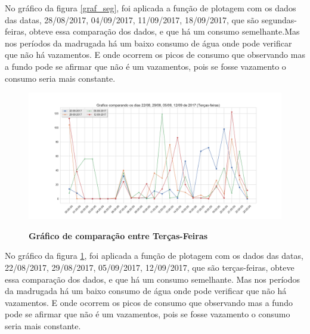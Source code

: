 \par No gráfico da figura \ref{graf_seg}, foi aplicada a função de plotagem com os dados das datas, 28/08/2017, 04/09/2017, 11/09/2017, 18/09/2017, que são segundas-feiras, obteve essa comparação dos dados, e que há um consumo semelhante.Mas nos períodos da madrugada há um baixo consumo de água onde pode verificar  que não há vazamentos. E onde ocorrem os picos de consumo que observando mas a fundo pode se afirmar que não é um vazamentos, pois se fosse vazamento o consumo seria mais constante.    

\begin{figure}[ht]
	\caption{\textbf{Gráfico de comparação entre Terças-Feiras}}
	\centering
		\includegraphics[width=\textwidth,height=\textheight , keepaspectratio]{figuras/Graficocomparandoosdias22-08,29-08,05-09,12-09de2017(Tercas-feiras)}
		\label{graf_ter}
\end{figure}

\par No gráfico da figura \ref{graf_ter}, foi aplicada a função de plotagem com os dados das datas, 22/08/2017, 29/08/2017, 05/09/2017, 12/09/2017, que são terças-feiras, obteve essa comparação dos dados, e que há um consumo semelhante. Mas nos períodos da madrugada há um baixo consumo de água onde pode verificar  que não há vazamentos. E onde ocorrem os picos de consumo que observando mas a fundo pode se afirmar que não é um vazamentos, pois se fosse vazamento o consumo seria mais constante.   

